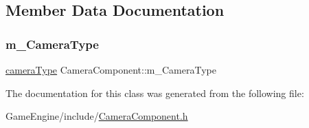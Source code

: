\subsection{Member Data Documentation}
\mbox{\label{class_camera_component_ac2c53e574361e9069c32baa344e90eae}} 
\subsubsection{\texorpdfstring{m\+\_\+\+Camera\+Type}{m\_CameraType}}
{\footnotesize\ttfamily \mbox{\hyperlink{_camera_component_8h_ab07ecb557631c59d8b7ec9c3db110dd5}{camera\+Type}} Camera\+Component\+::m\+\_\+\+Camera\+Type}



The documentation for this class was generated from the following file\+:\begin{DoxyCompactItemize}
\item 
Game\+Engine/include/\mbox{\hyperlink{_camera_component_8h}{Camera\+Component.\+h}}\end{DoxyCompactItemize}

